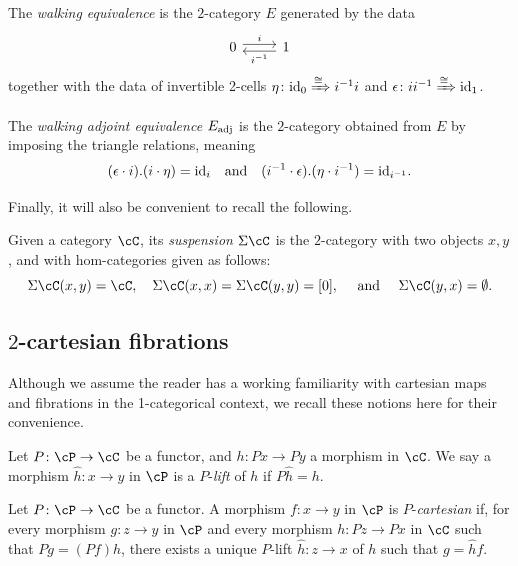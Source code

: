 \documentclass[11pt, dvipsnames]{amsart}
\begin{document}
			\begin{defn}\label{defn:walkingequiv}
				The \emph{walking equivalence} is the $2$-category $E$ generated by the data 
			\[\begin{tikzcd}
				0\rar[shift left,"i"] & 1\lar[shift left,"i^{-1}"]
			\end{tikzcd}\]
				together with the data of invertible 2-cells $\eta\colon\mathrm{id}_0\xRightarrow{\cong} i^{-1} i$ and $\epsilon\colon i  i^{-1} \xRightarrow{\cong} \mathrm{id}_1$. 
			\end{defn}
		
		\begin{defn}\label{defn:walkingadjointequiv}
			The \emph{walking adjoint equivalence} $E_{\mathrm{adj}}$ is the $2$-category obtained from $E$ by imposing the triangle relations, meaning
			\[ (\epsilon \cdot i) .  (i \cdot \eta) = \mathrm{id}_{i} \quad \text{and} \quad (i^{-1} \cdot \epsilon) . (\eta \cdot i^{-1}) = \mathrm{id}_{i^{-1}}. \]    \end{defn}
			

		Finally, it will also be convenient to recall the following.

		\begin{defn}\label{par:suspension}
			Given a category $\cC$, its \textit{suspension} $\Sigma\cC$ is the $2$-category with two objects $x,y$, and with 
			hom-categories given as follows:
			\[ \Sigma\cC(x,y)=\cC, \quad \Sigma \cC(x,x) = \Sigma \cC(y,y) = [0], \quad \text{ and } \quad \Sigma \cC(y,x)= \emptyset.\]
		\end{defn}

	\subsection{\texorpdfstring{$2$}{2}-cartesian fibrations} Although we assume the reader has a working familiarity with cartesian maps and fibrations in the 1-categorical context, we recall these notions here for their convenience.

	\begin{defn}
		Let $P\colon\cP \to \cC$ be a functor, and $h\colon Px\to Py$ a morphism in $\cC$. We say a morphism $\widehat{h}\colon x\to y$ in $\cP$ is a $P$-\emph{lift} of $h$ if $P\widehat{h}=h$.
	\end{defn}

	\begin{defn}\label{defn:cartesian1cat}
		Let $P\colon\cP \to \cC$ be a functor. A morphism $f\colon x \to y$ in $\cP$ is $P$-\emph{cartesian} if, for every morphism $g\colon z \to y$ in $\cP$ and every morphism $h\colon Pz \to Px$ in $\cC$ such that $ Pg = (Pf) h$, there exists a unique $P$-lift $\widehat{h}\colon z \to x$ of $h$ such that $g = \widehat{h} f$.
	\end{defn}
\end{document}
